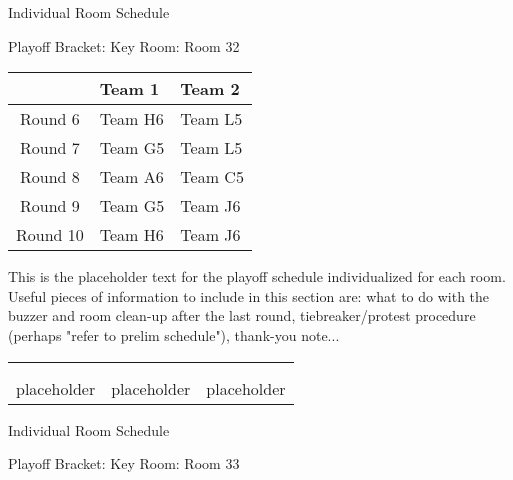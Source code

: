 \documentclass{article}%
\begin{document}
\newpage%
\begin{center}%
\begin{Huge}%
Individual Room Schedule%
\end{Huge}%
\vspace*{16pt}%
\linebreak%
\begin{Large}%
Playoff Bracket: Key \hfill Room: Room 32%
\end{Large}%
\end{center}%
%
\begin{tabularx}{\textwidth}{|c|Y|Y|}%
\hline%
&Team 1&Team 2\\%
\hline%
Round 6&Team H6&Team L5\\%
Round 7&Team G5&Team L5\\%
Round 8&Team A6&Team C5\\%
Round 9&Team G5&Team J6\\%
Round 10&Team H6&Team J6\\%
\hline%
\end{tabularx}%
\vspace*{16pt}%
\linebreak%
This is the placeholder text for the playoff schedule individualized for each room. Useful pieces of information to include in this section are: what to do with the buzzer and room clean{-}up after the last round, tiebreaker/protest procedure (perhaps "refer to prelim schedule"), thank{-}you note...%
\vspace*{30pt}%
\newline%
%
\begin{tabularx}{\textwidth}{YYY}%
  &  &  \\%
\\%
placeholder&placeholder&placeholder\\%
\end{tabularx}%
\newpage%
\begin{center}%
\begin{Huge}%
Individual Room Schedule%
\end{Huge}%
\vspace*{16pt}%
\linebreak%
\begin{Large}%
Playoff Bracket: Key \hfill Room: Room 33%
\end{Large}%
\end{center}%
\end{document}
